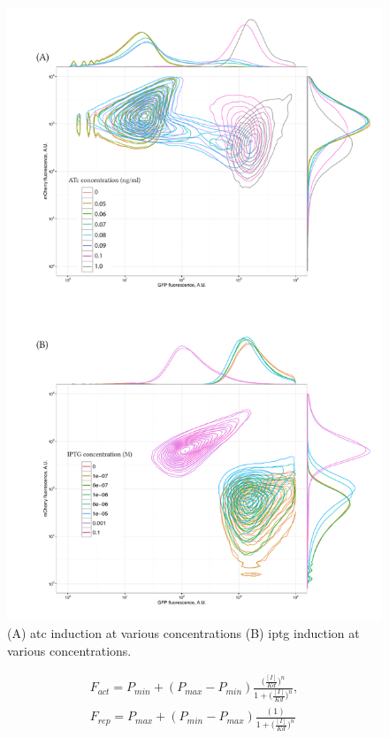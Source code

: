 \begin{figure}[htbp]
	\begin{center}
\includegraphics[scale=0.7]{../../chapters/chapterABCFlow/images/pKDL071_concentrations_2d1d.pdf}
\caption[Inducer concentration assay of pKDL071]{\label{fig:switch_concent2d1d}(A) \acrshort{atc} induction at various concentrations (B) \acrshort{iptg} induction at various concentrations. }
\end{center}
\end{figure}


\begin{align}
 	F_{act} = P_{min} + (P_{max} - P_{min})\frac{\Big(\frac{[I]}{Kd}\Big)^n}{1+\Big(\frac{[I]}{Kd}\Big)^n},\\
 	F_{rep} = P_{max} + (P_{min} - P_{max})\frac{(1)}{1+\Big(\frac{[I]}{Kd}\Big)^n}
\end{align}
 
